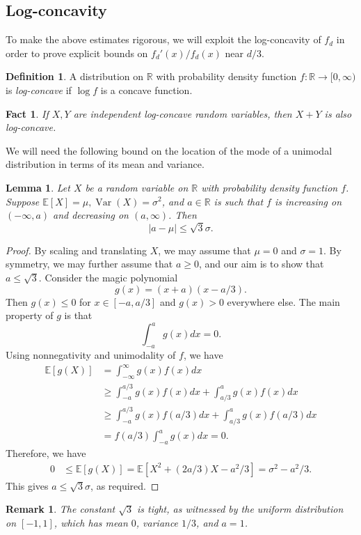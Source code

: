 \documentclass{article}
\newcommand{\EE}{\mathbb{E}}
\newcommand{\RR}{\mathbb{R}}
\newtheorem{lem}[thm]{Lemma}
\newtheorem{fact}[thm]{Fact}
\newtheorem*{rmk}{Remark}
\theoremstyle{definition}
\newtheorem{defn}[thm]{Definition}
\DeclareMathOperator{\Var}{Var}
\begin{document}
\subsection{Log-concavity}

To make the above estimates rigorous, we will exploit the log-concavity of $f_d$ in order to prove explicit bounds on $f_d'(x)/f_d(x)$ near $d/3$.

\begin{defn}
    A distribution on $\RR$ with probability density function $f:\RR\to [0,\infty)$ is \emph{log-concave} if $\log f$ is a concave function.
\end{defn}
\begin{fact} \label{fact:log-concave-add}
    If $X,Y$ are independent log-concave random variables, then $X+Y$ is also log-concave.
\end{fact}

We will need the following bound on the location of the mode of a unimodal distribution in terms of its mean and variance.

\begin{lem} \label{lem:unimodal}
    Let $X$ be a random variable on $\RR$ with probability density function $f$. Suppose $\EE[X]=\mu, \Var(X)=\sigma^2$, and $a\in \RR$ is such that $f$ is increasing on $(-\infty,a)$ and decreasing on $(a,\infty)$. Then 
    \[|a-\mu|\leq \sqrt{3}\sigma.\]
\end{lem}
\begin{proof}
    By scaling and translating $X$, we may assume that $\mu=0$ and $\sigma=1$. By symmetry, we may further assume that $a\geq 0$, and our aim is to show that $a\leq \sqrt{3}$. Consider the magic polynomial
    \[g(x)=(x+a)(x-a/3).\]
    Then $g(x)\leq 0$ for $x\in [-a,a/3]$ and $g(x)>0$ everywhere else. The main property of $g$ is that
    \[\int_{-a}^a g(x)dx=0.\]
    Using nonnegativity and unimodality of $f$, we have
    \begin{align*}
        \EE[g(X)] &= \int_{-\infty}^\infty g(x)f(x)dx \\
        &\geq \int_{-a}^{a/3} g(x)f(x)dx + \int_{a/3}^a g(x)f(x)dx \\
        &\geq \int_{-a}^{a/3} g(x)f(a/3)dx + \int_{a/3}^a g(x)f(a/3)dx \\
        &= f(a/3) \int_{-a}^a g(x)dx = 0.
    \end{align*}
    Therefore, we have
    \begin{align*}
        0 &\leq \EE[g(X)] = \EE[X^2+(2a/3)X - a^2/3] = \sigma^2-a^2/3.
    \end{align*}
    This gives $a\leq \sqrt{3}\sigma$, as required.
\end{proof}
\begin{rmk}
    The constant $\sqrt{3}$ is tight, as witnessed by the uniform distribution on $[-1,1]$, which has mean $0$, variance $1/3$, and $a=1$.
\end{rmk}
\end{document}
